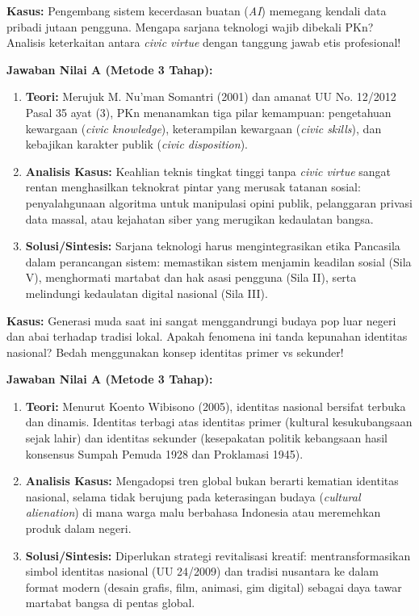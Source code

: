 \documentclass[10pt,a4paper]{article}
\begin{document}
\begin{soalbox}
\textbf{Kasus:} Pengembang sistem kecerdasan buatan (\textit{AI}) memegang kendali data pribadi jutaan pengguna. Mengapa sarjana teknologi wajib dibekali PKn? Analisis keterkaitan antara \textit{civic virtue} dengan tanggung jawab etis profesional!

\tcblower
\textbf{Jawaban Nilai A (Metode 3 Tahap):}
\begin{enumerate}
  \item \textbf{Teori:} Merujuk M. Nu'man Somantri (2001) dan amanat UU No. 12/2012 Pasal 35 ayat (3), PKn menanamkan tiga pilar kemampuan: pengetahuan kewargaan (\textit{civic knowledge}), keterampilan kewargaan (\textit{civic skills}), dan kebajikan karakter publik (\textit{civic disposition}).
  \item \textbf{Analisis Kasus:} Keahlian teknis tingkat tinggi tanpa \textit{civic virtue} sangat rentan menghasilkan teknokrat pintar yang merusak tatanan sosial: penyalahgunaan algoritma untuk manipulasi opini publik, pelanggaran privasi data massal, atau kejahatan siber yang merugikan kedaulatan bangsa.
  \item \textbf{Solusi/Sintesis:} Sarjana teknologi harus mengintegrasikan etika Pancasila dalam perancangan sistem: memastikan sistem menjamin keadilan sosial (Sila V), menghormati martabat dan hak asasi pengguna (Sila II), serta melindungi kedaulatan digital nasional (Sila III).
\end{enumerate}
\end{soalbox}

\begin{soalbox}
\textbf{Kasus:} Generasi muda saat ini sangat menggandrungi budaya pop luar negeri dan abai terhadap tradisi lokal. Apakah fenomena ini tanda kepunahan identitas nasional? Bedah menggunakan konsep identitas primer vs sekunder!

\tcblower
\textbf{Jawaban Nilai A (Metode 3 Tahap):}
\begin{enumerate}
  \item \textbf{Teori:} Menurut Koento Wibisono (2005), identitas nasional bersifat terbuka dan dinamis. Identitas terbagi atas identitas primer (kultural kesukubangsaan sejak lahir) dan identitas sekunder (kesepakatan politik kebangsaan hasil konsensus Sumpah Pemuda 1928 dan Proklamasi 1945).
  \item \textbf{Analisis Kasus:} Mengadopsi tren global bukan berarti kematian identitas nasional, selama tidak berujung pada keterasingan budaya (\textit{cultural alienation}) di mana warga malu berbahasa Indonesia atau meremehkan produk dalam negeri.
  \item \textbf{Solusi/Sintesis:} Diperlukan strategi revitalisasi kreatif: mentransformasikan simbol identitas nasional (UU 24/2009) dan tradisi nusantara ke dalam format modern (desain grafis, film, animasi, gim digital) sebagai daya tawar martabat bangsa di pentas global.
\end{enumerate}
\end{soalbox}
\end{document}
